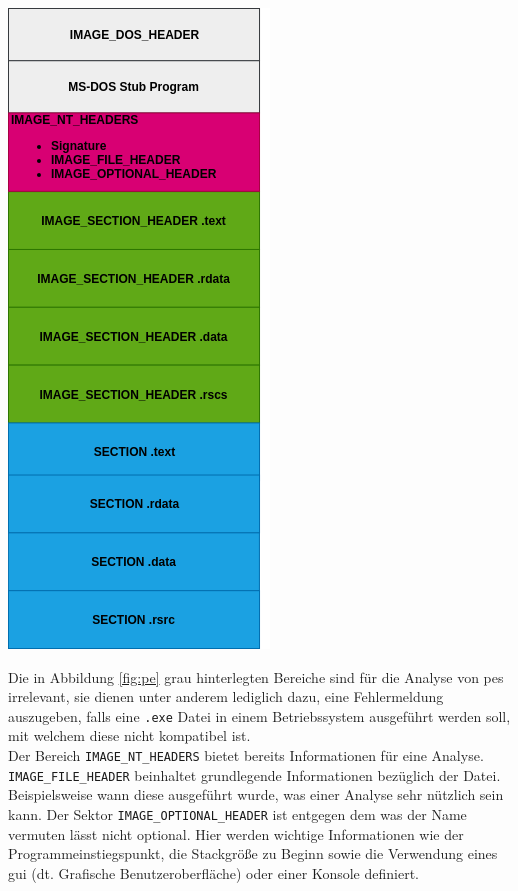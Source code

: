 \documentclass[
    12pt, %
    DIV10,
    ngerman, %
    a4paper, %
    oneside, %
    titlepage, %
    parskip=half, %
    headings=normal, %
    listof=totoc, %
    bibliography=totoc, %
    index=totoc, %
    captions=tableheading, %
    final %
]{scrreprt}
\begin{document}
\begin{center}
\includegraphics[scale=0.5]{img/pe.png}
\label{fig:pe}
\end{center}
Die in Abbildung \ref{fig:pe} grau hinterlegten Bereiche sind für die Analyse von \ac{pes} irrelevant, sie dienen unter anderem lediglich dazu, eine Fehlermeldung auszugeben, falls eine \texttt{.exe} Datei in einem Betriebssystem ausgeführt werden soll, mit welchem diese nicht kompatibel ist.\\
Der Bereich \texttt{IMAGE\_NT\_HEADERS} bietet bereits Informationen für eine Analyse. \texttt{IMAGE\_FILE\_HEADER} beinhaltet grundlegende Informationen bezüglich der Datei. Beispielsweise wann diese ausgeführt wurde, was einer Analyse sehr nützlich sein kann. Der Sektor \texttt{IMAGE\_OPTIONAL\_HEADER} ist entgegen dem was der Name vermuten lässt nicht optional. Hier werden wichtige Informationen wie der Programmeinstiegspunkt, die Stackgrö{\ss}e zu Beginn sowie die Verwendung eines \ac{gui} (dt. Grafische Benutzeroberfläche) oder einer Konsole definiert.\\
\end{document}
